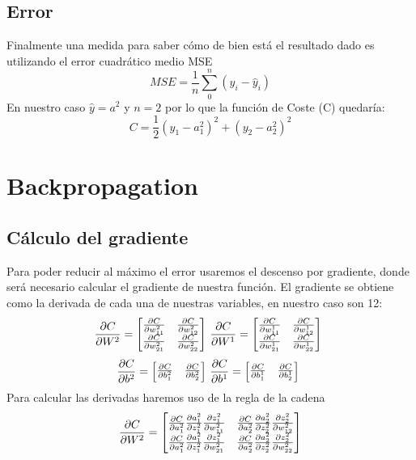 \documentclass{article}
\begin{document}
\subsection{Error}
Finalmente una medida para saber cómo de bien está el resultado dado es utilizando el error cuadrático medio MSE
\[
MSE = \frac{1}{n} \sum_{0}^{n} (y_i - \hat{y}_i )
\]
En nuestro caso \( \hat{y} = a^2\) y \(n = 2\) por lo que la función de Coste (C) quedaría:
\[
C = \frac{1}{2} (y_1 - a^2_1)^2 + (y_2 - a^2_2)^2
\]

\section{Backpropagation}
\subsection{Cálculo del gradiente}
Para poder reducir al máximo el error usaremos el descenso por gradiente, donde será necesario calcular el gradiente de nuestra función.
El gradiente se obtiene como la derivada de cada una de nuestras variables, en nuestro caso son 12:
\[
\frac{\partial C}{\partial W^2} = \scalebox{1}{$
	\begin{bmatrix}
		\frac{\partial C}{\partial w^2_{11}} & \frac{\partial C}{\partial w^2_{12}} \\
		\frac{\partial C}{\partial w^2_{21}} & \frac{\partial C}{\partial w^2_{22}}
	\end{bmatrix}$
}
\frac{\partial C}{\partial W^1} = \scalebox{1}{$
	\begin{bmatrix}
		\frac{\partial C}{\partial w^1_{11}} & \frac{\partial C}{\partial w^1_{12}} \\
		\frac{\partial C}{\partial w^1_{21}} & \frac{\partial C}{\partial w^1_{22}}
	\end{bmatrix}$
}
\]
\[
\frac{\partial C}{\partial b^2} = \scalebox{1}{$
	\begin{bmatrix}
		\frac{\partial C}{\partial b^2_1} & \frac{\partial C}{\partial b^2_2} 
	\end{bmatrix}$
}
\frac{\partial C}{\partial b^1} = \scalebox{1}{$
	\begin{bmatrix}
		\frac{\partial C}{\partial b^1_1} & \frac{\partial C}{\partial b^1_2} 
	\end{bmatrix}$
}
\]
Para calcular las derivadas haremos uso de la regla de la cadena
\[
\frac{\partial C} {\partial W^2} =  \scalebox{1}{$ \begin{bmatrix}
	\frac{\partial C}{\partial a^2_1} \frac{\partial  a^2_1}{\partial z^2_1} \frac{\partial z^2_1 }{\partial w^2_{11}} &
	\frac{\partial C}{\partial a^2_2} \frac{\partial  a^2_2}{\partial z^2_2} \frac{\partial z^2_2}{\partial w^2_{12}} \\
	\frac{\partial C}{\partial a^2_1} \frac{\partial  a^2_1}{\partial z^2_1} \frac{\partial z^2_1}{\partial w^2_{21}}  & 
	\frac{\partial C}{\partial a^2_2} \frac{\partial  a^2_2}{\partial z^2_2} \frac{\partial z^2_2}{\partial w^2_{22}}
\end{bmatrix}$}
\]
\end{document}
